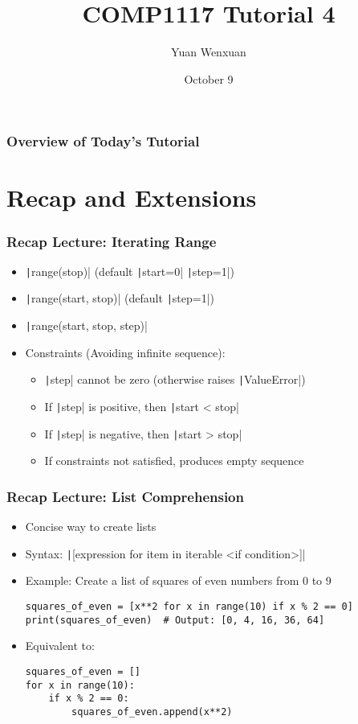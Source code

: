 \documentclass{beamer}
\title{COMP1117 Tutorial 4}
\author{Yuan Wenxuan}
\date{October 9}
\begin{document}
\frame{\titlepage}

\begin{frame}
    \frametitle{Overview of Today's Tutorial}
    \tableofcontents
\end{frame}

\section{Recap and Extensions}
\begin{frame}
    \frametitle{Recap Lecture: Iterating Range}
    \begin{itemize}
        \item \texttt|range(stop)| (default \texttt|start=0| \texttt|step=1|)
        \item \texttt|range(start, stop)| (default \texttt|step=1|)
        \item \texttt|range(start, stop, step)|
        \item Constraints (Avoiding infinite sequence):
              \begin{itemize}
                  \item \texttt|step| cannot be zero (otherwise raises \texttt|ValueError|)
                  \item If \texttt|step| is positive, then \texttt|start < stop|
                  \item If \texttt|step| is negative, then \texttt|start > stop|
                  \item If constraints not satisfied, produces empty sequence
              \end{itemize}
    \end{itemize}
\end{frame}

\begin{frame}[fragile]
    \frametitle{Recap Lecture: List Comprehension}
    \begin{itemize}
        \item Concise way to create lists
        \item Syntax: \texttt|[expression for item in iterable <if condition>]|
        \item Example: Create a list of squares of even numbers from 0 to 9
              \begin{verbatim}
squares_of_even = [x**2 for x in range(10) if x % 2 == 0]
print(squares_of_even)  # Output: [0, 4, 16, 36, 64]
              \end{verbatim}
        \item Equivalent to:
              \begin{verbatim}
squares_of_even = []
for x in range(10):
    if x % 2 == 0:
        squares_of_even.append(x**2)
              \end{verbatim}
    \end{itemize}
\end{frame}
\end{document}
